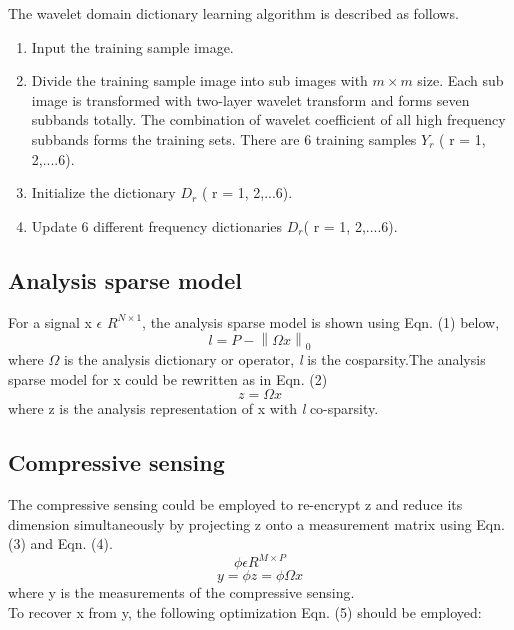 \documentclass[10pt,a4paper,journal]{IEEEtran}
\begin{document}
The wavelet domain dictionary learning algorithm is described as follows. \\
\begin{enumerate}
\item Input the training sample image.
\item Divide the training sample image into sub images with $ m \times m $ size. Each sub image is transformed with two-layer wavelet transform and forms seven subbands totally. \cite{3} The combination of wavelet coefficient of all high frequency subbands forms the training sets. There are 6 training samples $Y_{r}$ ( r = 1, 2,....6). 
\item  Initialize the dictionary $D_{r}$ ( r = 1, 2,...6).
\item  Update 6 different frequency dictionaries $D_{r}$( r = 1, 2,....6).
\end{enumerate} 

\subsection{Analysis sparse model}
\hspace*{2em} For a signal x $\epsilon$ $R^{N \times 1}$, the analysis sparse model is shown using Eqn. (1)\cite{4} below,\\
\begin{equation}
l = P - \left \| \Omega x \right \|_{0}
\end{equation}
where $\Omega$ is the analysis  dictionary or operator, \textit{l} is the cosparsity.The analysis sparse model for x could be rewritten as in Eqn. (2)\cite{4}\\
\begin{equation}
z = \Omega x
\end{equation}
where z is the analysis representation\cite{4} of x with \textit{l} co-sparsity.

\subsection{Compressive sensing}
\hspace*{2em} The compressive sensing\cite{5} could be employed to re-encrypt z and reduce its
dimension simultaneously by projecting z onto a measurement matrix using Eqn. (3)\cite{4} and Eqn. (4)\cite{4}.
\begin{equation}
\phi \epsilon R^{M×P}
\end{equation}
\begin{equation}
y = \phi z = \phi \Omega x
\end{equation}
where y is the measurements of the compressive sensing.\\
To recover x from y, the following optimization Eqn. (5)\cite{4} should be employed:
\end{document}
